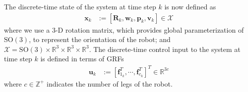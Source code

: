 The discrete-time state of the system at time step $k$ is now defined as
\begin{align}
\label{eq:NMPC_state}
\mathbf{x}_{k} &:= [\mathbf{R}_{k}, \mathbf{w}_{k}, \mathbf{p}_{k}, \mathbf{v}_{k}] \in \mathcal{X}
\end{align}
where we use a 3-D rotation matrix, which provides global parameterization of $\mathrm{SO}(3)$, to represent the orientation of the robot; and $\mathcal{X}=\mathrm{SO}(3) \times \mathbb{R}^3 \times \mathbb{R}^3 \times \mathbb{R}^3$.
The discrete-time control input to the system at time step $k$ is defined in terms of GRFs
\begin{align}
\label{eq:NMPC_control}
\mathbf{u}_{k} &:= {\left[ {\mathbf{f}}^{T}_{1_k}, \cdots, {\mathbf{f}}^{T}_{c_k} \right]}^T \in \mathbb{R}^{3c}
\end{align}
where $c \in \mathbb{Z}^{+}$ indicates the number of legs of the robot.

